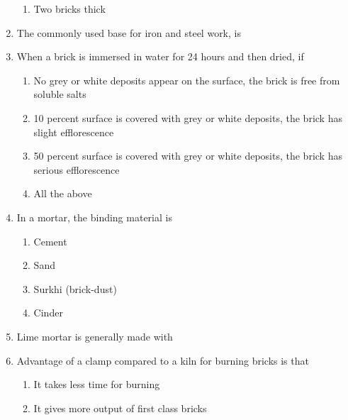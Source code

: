 \documentclass[11pt,a4paper]{article}
\begin{document}
\begin{enumerate}
\begin{enumerate}[label=\Alph*.]
\item{Two bricks thick}
\end{enumerate}
\item{The commonly used base for iron and steel work, is}
\\
\item{When a brick is immersed in water for 24 hours and then dried, if}
\begin{enumerate}[label=\Alph*.]
\item{No grey or white deposits appear on the surface, the brick is free from soluble salts}
\item{10 percent surface is covered with grey or white deposits, the brick has slight efflorescence}
\item{50 percent surface is covered with grey or white deposits, the brick has serious efflorescence}
\item{All the above}
\end{enumerate}
\item{In a mortar, the binding material is}
\begin{enumerate}[label=\Alph*.]
\item{Cement}
\item{Sand}
\item{Surkhi (brick-dust)}
\item{Cinder}
\end{enumerate}
\item{Lime mortar is generally made with}
\\
\item{Advantage of a clamp compared to a kiln for burning bricks is that}
\begin{enumerate}[label=\Alph*.]
\item{It takes less time for burning}
\item{It gives more output of first class bricks}

\end{enumerate}
\end{enumerate}
\end{document}
